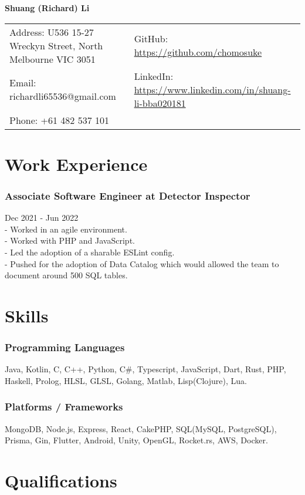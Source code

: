 \documentclass[9pt]{extarticle}
\begin{document}
\begin{center}
	\textbf{\LARGE Shuang (Richard) Li}
\end{center}

{\small
\begin{tabular}{l l}
	Address: U536 15-27 Wreckyn Street, North Melbourne VIC 3051 & GitHub: \url{https://github.com/chomosuke} \\
	Email: richardli65536@gmail.com & LinkedIn: \url{https://www.linkedin.com/in/shuang-li-bba020181} \\
	Phone: +61 482 537 101
\end{tabular}
}

\section*{Work Experience}
\subsubsection*{Associate Software Engineer at Detector Inspector}
Dec 2021 - Jun 2022\\
- Worked in an agile environment.\\
- Worked with PHP and JavaScript.\\
- Led the adoption of a sharable ESLint config.\\
- Pushed for the adoption of Data Catalog which would allowed the team to document around 500 SQL tables.

\section*{Skills}
\subsubsection*{Programming Languages}
Java, Kotlin, C, C++, Python, C\#, Typescript, JavaScript, Dart, Rust, PHP, Haskell, Prolog, HLSL, GLSL, Golang, Matlab, Lisp(Clojure), Lua.
\subsubsection*{Platforms / Frameworks}
MongoDB, Node.js, Express, React, CakePHP, SQL(MySQL, PostgreSQL), Prisma, Gin, Flutter, Android, Unity, OpenGL, Rocket.rs, AWS, Docker.

\section*{Qualifications}
\end{document}
